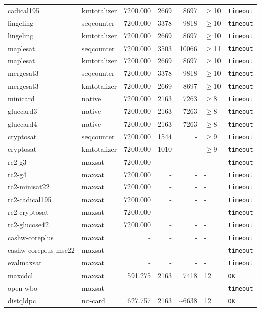 \begin{longtable}{llrrrl p{}}
cadical195 & kmtotalizer & 7200.000 & 2669 & 8697 & $\geq$10 & \texttt{timeout} \\
lingeling & seqcounter & 7200.000 & 3378 & 9818 & $\geq$10 & \texttt{timeout} \\
lingeling & kmtotalizer & 7200.000 & 2669 & 8697 & $\geq$10 & \texttt{timeout} \\
maplesat & seqcounter & 7200.000 & 3503 & 10066 & $\geq$11 & \texttt{timeout} \\
maplesat & kmtotalizer & 7200.000 & 2669 & 8697 & $\geq$10 & \texttt{timeout} \\
mergesat3 & seqcounter & 7200.000 & 3378 & 9818 & $\geq$10 & \texttt{timeout} \\
mergesat3 & kmtotalizer & 7200.000 & 2669 & 8697 & $\geq$10 & \texttt{timeout} \\
minicard & native & 7200.000 & 2163 & 7263 & $\geq$8 & \texttt{timeout} \\
gluecard3 & native & 7200.000 & 2163 & 7263 & $\geq$8 & \texttt{timeout} \\
gluecard4 & native & 7200.000 & 2163 & 7263 & $\geq$8 & \texttt{timeout} \\
cryptosat & seqcounter & 7200.000 & 1544 & - & $\geq$9 & \texttt{timeout} \\
cryptosat & kmtotalizer & 7200.000 & 1010 & - & $\geq$9 & \texttt{timeout} \\
rc2-g3 & maxsat & 7200.000 & - & - & - & \texttt{timeout} \\
rc2-g4 & maxsat & 7200.000 & - & - & - & \texttt{timeout} \\
rc2-minisat22 & maxsat & 7200.000 & - & - & - & \texttt{timeout} \\
rc2-cadical195 & maxsat & 7200.000 & - & - & - & \texttt{timeout} \\
rc2-cryptosat & maxsat & 7200.000 & - & - & - & \texttt{timeout} \\
rc2-glucose42 & maxsat & 7200.000 & - & - & - & \texttt{timeout} \\
cashw-coreplus & maxsat & - & - & - & - & \texttt{timeout} \\
cashw-coreplus-mse22 & maxsat & - & - & - & - & \texttt{timeout} \\
evalmaxsat & maxsat & - & - & - & - & \texttt{timeout} \\
maxcdcl & maxsat & 591.275 & 2163 & 7418 & 12 & \texttt{OK} \\
open-wbo & maxsat & - & - & - & - & \texttt{timeout} \\
distqldpc & no-card & 627.757 & 2163 & \textasciitilde{}6638 & 12 & \texttt{OK} \\

\end{longtable}

